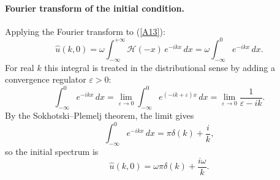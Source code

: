 \documentclass{article}
\newcommand{\infint}{\displaystyle\int_{-\infty}^{+\infty}}
\begin{document}
\paragraph{Fourier transform of the initial condition.}
Applying the Fourier transform to (\ref{A13}):
\begin{equation}
\hat{u}(k,0) = \omega\infint \mathcal{H}(-x)\,e^{-ikx}\,dx
             = \omega\int_{-\infty}^{0}e^{-ikx}\,dx.
\label{A14}
\end{equation}
For real $k$ this integral is treated in the distributional sense by adding a
convergence regulator $\varepsilon>0$:
\begin{equation*}
\int_{-\infty}^{0}e^{-ikx}\,dx
= \lim_{\varepsilon\to 0}\int_{-\infty}^{0}e^{(-ik+\varepsilon)x}\,dx
= \lim_{\varepsilon\to 0}\frac{1}{\varepsilon - ik}.
\end{equation*}
By the Sokhotski--Plemelj theorem, the limit gives
\begin{equation*}
\int_{-\infty}^{0}e^{-ikx}\,dx = \pi\delta(k) + \frac{i}{k},
\end{equation*}
so the initial spectrum is
\begin{equation}
\hat{u}(k,0)= \omega\pi\delta(k) + \frac{i\omega}{k}.
\label{A15}
\end{equation}
\end{document}
